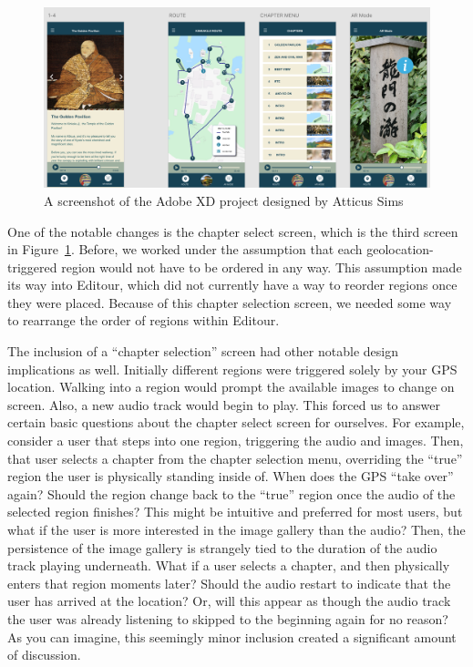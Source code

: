 \documentclass[a4paper, 10pt, american, titlepage]{article}
\begin{document}
\begin{figure}[h]
	\centering
	\includegraphics[width=1\textwidth]{adobe-xd-design.png}
	\caption[A screenshot of the Adobe XD project designed by Atticus Sims]
    {A screenshot of the Adobe XD project designed by Atticus Sims}
	\label{fig:adobeXdDesign}
\end{figure}

One of the notable changes is the chapter select screen, which is the third
screen in Figure~\ref{fig:adobeXdDesign}. Before, we worked under the assumption
that each geolocation-triggered region would not have to be ordered in any way.
This assumption made its way into Editour, which did not currently have a way
to reorder regions once they were placed. Because of this chapter selection
screen, we needed some way to rearrange the order of regions within Editour.

The inclusion of a ``chapter selection'' screen had other notable design
implications as well. Initially different regions were triggered solely by your
GPS location. Walking into a region would prompt the available images to change
on screen. Also, a new audio track would begin to play. This forced us to
answer certain basic questions about the chapter select screen for ourselves.
For example, consider a user that steps into one region, triggering the audio
and images. Then, that user selects a chapter from the chapter selection menu,
overriding the ``true'' region the user is physically standing inside of. When
does the GPS ``take over'' again? Should the region change back to the ``true''
region once the audio of the selected region finishes? This might be intuitive
and preferred for most users, but what if the user is more interested in the
image gallery than the audio? Then, the persistence of the image gallery is
strangely tied to the duration of the audio track playing underneath. What if a
user selects a chapter, and then physically enters that region moments later?
Should the audio restart to indicate that the user has arrived at the location?
Or, will this appear as though the audio track the user was already listening
to skipped to the beginning again for no reason? As you can imagine, this
seemingly minor inclusion created a significant amount of discussion.
\end{document}

